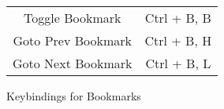 \documentclass[10pt]{article}
\begin{document}
	\begin{figure}[H]
		\centering
		\begin{tabular}{@{}c c@{}}
			\midrule

			Toggle Bookmark & Ctrl + B, B \\
			Goto Prev Bookmark & Ctrl + B, H \\
			Goto Next Bookmark & Ctrl + B, L \\

			\bottomrule
		\end{tabular}
		\caption{Keybindings for Bookmarks}
	\end{figure}
\end{document}
